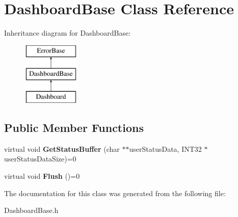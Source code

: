 \hypertarget{classDashboardBase}{
\section{DashboardBase Class Reference}
\label{classDashboardBase}
}
Inheritance diagram for DashboardBase:\begin{figure}[H]
\begin{center}
\leavevmode
\includegraphics[height=3.000000cm]{classDashboardBase}
\end{center}
\end{figure}
\subsection*{Public Member Functions}
\begin{DoxyCompactItemize}
\item 
\hypertarget{classDashboardBase_a3cecc6b40debb394d33aa7b86b3771bc}{
virtual void {\bfseries GetStatusBuffer} (char $\ast$$\ast$userStatusData, INT32 $\ast$userStatusDataSize)=0}
\label{classDashboardBase_a3cecc6b40debb394d33aa7b86b3771bc}

\item 
\hypertarget{classDashboardBase_a5b6aa2f259cf4a7e159d94bd7499c21a}{
virtual void {\bfseries Flush} ()=0}
\label{classDashboardBase_a5b6aa2f259cf4a7e159d94bd7499c21a}

\end{DoxyCompactItemize}


The documentation for this class was generated from the following file:\begin{DoxyCompactItemize}
\item 
DashboardBase.h\end{DoxyCompactItemize}
